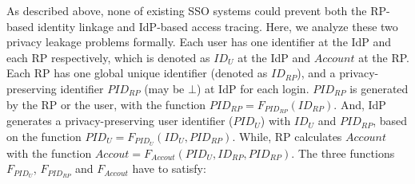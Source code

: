 As described above, none of existing SSO systems could prevent both the RP-based identity linkage and IdP-based access tracing.
Here, we analyze these two privacy leakage problems formally.
Each user has one identifier at the IdP and each RP respectively, which is denoted as $ID_U$ at the IdP and $Account$ at the RP.
Each RP has one global unique identifier (denoted as $ID_{RP}$), and a privacy-preserving identifier $PID_{RP}$ (may be $\bot$) at IdP for each login.
$PID_{RP}$ is generated by the RP or the user, with the function $PID_{RP}=F_{PID_{RP}}(ID_{RP})$.
And, IdP generates a  privacy-preserving user identifier ($PID_U$) with $ID_U$ and $PID_{RP}$, based on the function  $PID_{U}=F_{PID_{U}}(ID_U, PID_{RP})$.
While,  RP calculates $Account$ with the function  $Accout=F_{Accout}(PID_U, ID_{RP}, PID_{RP})$.
The three functions $F_{PID_{U}}$, $F_{PID_{RP}}$ and $F_{Accout}$  have to satisfy:
